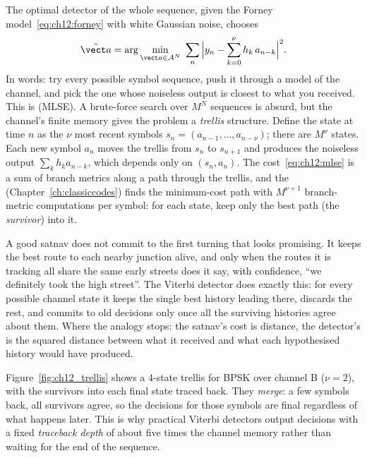 The optimal detector of the whole sequence, given the Forney model~\eqref{eq:ch12:forney} with white
Gaussian noise, chooses
\begin{equation}
\hat{\vect a}=\arg\min_{\vect a\in\mathcal A^N}\ \sum_n\Big|y_n-\sum_{k=0}^{\nu}h_k\,a_{n-k}\Big|^2 .
\label{eq:ch12:mlse}
\end{equation}
In words: try every possible symbol sequence, push it through a model of the channel, and pick the
one whose noiseless output is closest to what you received. This is  (MLSE). A brute-force search over $M^N$ sequences is absurd, but the channel's
finite memory gives the problem a \emph{trellis} structure. Define the state at time $n$ as the $\nu$
most recent symbols $s_n=(a_{n-1},\dots,a_{n-\nu})$; there are $M^\nu$ states. Each new symbol $a_n$
moves the trellis from $s_n$ to $s_{n+1}$ and produces the noiseless output $\sum_k h_ka_{n-k}$,
which depends only on $(s_n,a_n)$. The cost~\eqref{eq:ch12:mlse} is a sum of branch metrics along a
path through the trellis, and the  (Chapter~\ref{ch:classiccodes}) finds the
minimum-cost path with $M^{\nu+1}$ branch-metric computations per symbol: for each state, keep only
the best path (the \emph{survivor}) into it.


\begin{analogy}
A good satnav does not commit to the first turning that looks promising. It keeps the best route
to each nearby junction alive, and only when the routes it is tracking all share the same early
streets does it say, with confidence, ``we definitely took the high street''. The Viterbi detector
does exactly this: for every possible channel state it keeps the single best history leading there,
discards the rest, and commits to old decisions only once all the surviving histories agree about
them. Where the analogy stops: the satnav's cost is distance, the detector's is the squared
distance between what it received and what each hypothesised history would have produced.
\end{analogy}

Figure~\ref{fig:ch12_trellis} shows a 4-state trellis for BPSK over channel B ($\nu=2$), with the
survivors into each final state traced back. They \emph{merge}: a few symbols back, all survivors
agree, so the decisions for those symbols are final regardless of what happens later. This is why
practical Viterbi detectors output decisions with a fixed \emph{traceback depth} of about five times
the channel memory rather than waiting for the end of the sequence.

